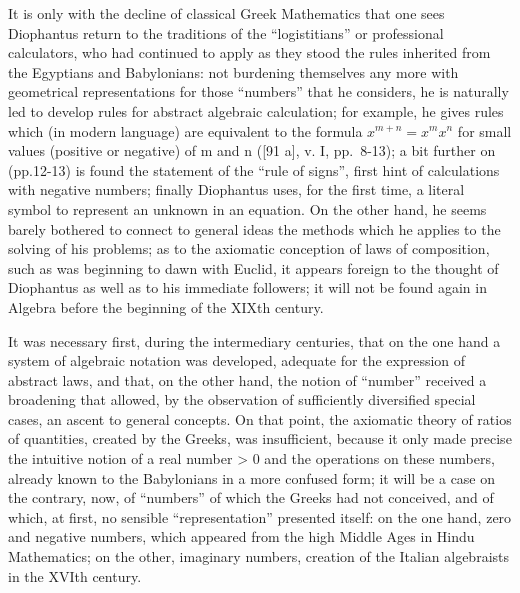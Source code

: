 It is only with the decline of classical Greek Mathematics that one sees Diophantus return to the traditions of the ``logistitians'' or professional calculators, who had continued to apply as they stood the rules inherited from the Egyptians and Babylonians: not burdening themselves any more with geometrical representations for those ``numbers'' that he considers, he is naturally led to develop rules for abstract algebraic calculation; for example, he gives rules which (in modern language) are equivalent to the formula \(x^{m+n} = x^{m}x^{n}\) for small values (positive or negative) of m and n ({[}91 a{]}, v. I, pp.~8-13); a bit further on (pp.12-13) is found the statement of the ``rule of signs'', first hint of calculations with negative numbers; finally Diophantus uses, for the first time, a literal symbol to represent an unknown in an equation. On the other hand, he seems barely bothered to connect to general ideas the methods which he applies to the solving of his problems; as to the axiomatic conception of laws of composition, such as was beginning to dawn with Euclid, it appears foreign to the thought of Diophantus as well as to his immediate followers; it will not be found again in Algebra before the beginning of the XIXth century.

It was necessary first, during the intermediary centuries, that on the one hand a system of algebraic notation was developed, adequate for the expression of abstract laws, and that, on the other hand, the notion of ``number'' received a broadening that allowed, by the observation of sufficiently diversified special cases, an ascent to general concepts. On that point, the axiomatic theory of ratios of quantities, created by the Greeks, was insufficient, because it only made precise the intuitive notion of a real number \textgreater{} 0 and the operations on these numbers, already known to the Babylonians in a more confused form; it will be a case on the contrary, now, of ``numbers'' of which the Greeks had not conceived, and of which, at first, no sensible ``representation'' presented itself: on the one hand, zero and negative numbers, which appeared from the high Middle Ages in Hindu Mathematics; on the other, imaginary numbers, creation of the Italian algebraists in the XVIth century.

